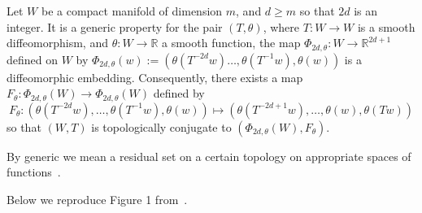 \begin{Theorem} 
	\label{Thm_Takens}
         Let $W$ be a compact manifold of dimension $m$, and $d\ge m$ so that $2d$ is an integer. It is a 
            generic property for the pair $(T, \theta)$,  where $T:W \to W$ is
            a smooth diffeomorphism, and $\theta:W \to \mathbb{R}$ a smooth function, the map $\Phi_{2d,\theta}:W \to \mathbb{R}^{2d+1}$ defined on $W$ by 
            $\Phi_{2d,\theta}(w) := (\theta(T^{-2d}w)\ldots,\theta(T^{-1}w),\theta(w))$
            is a diffeomorphic embedding. Consequently, there exists a map $F_\theta: \Phi_{2d,\theta}(W) \to \Phi_{2d,\theta}(W)$ defined by \[F_\theta: (\theta(T^{-2d}w),\ldots,\theta(T^{-1}w),\theta(w)) \mapsto 
            (\theta(T^{-2d+1}w),\ldots,\theta(w),\theta(Tw)) \]
           so that $(W,T)$ is topologically conjugate to 
            $(\Phi_{2d,\theta}(W), F_\theta)$.    
\end{Theorem} 

By generic we mean a residual set on a certain topology on appropriate spaces of functions~\cite{takens1981detecting}.

Below we reproduce Figure 1 from~\cite{Supp}.



